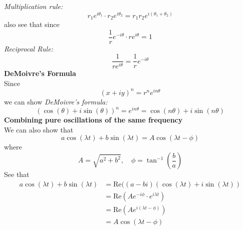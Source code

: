 \documentclass{report}
\begin{document}
\textit{Multiplication rule:}
\begin{equation*}
r_1e^{i\theta_1}\cdot r_2e^{i\theta_2}=r_1r_2e^{i(\theta_1+\theta_2)}
\end{equation*}
also see that since
\begin{equation*}
\frac{1}{r}e^{-i\theta}\cdot re^{i\theta}=1
\end{equation*}
\textit{Reciprocal Rule:} 
\begin{equation*}
\frac{1}{re^{i\theta}}=\frac{1}{r}e^{-i\theta}
\end{equation*}
\textbf{DeMoivre's Formula}\\
Since 
\begin{equation*}
(x+iy)^n=r^ne^{in\theta}
\end{equation*}
we can show \textit{DeMoivre's formula:}
\begin{equation*}
(\cos(\theta)+i\sin(\theta))^n=e^{in\theta}=\cos(n\theta)+i\sin(n\theta)
\end{equation*}
\textbf{Combining pure oscillations of the same frequency}\\
We can also show that
\begin{equation*}
a\cos(\lambda t)+b\sin(\lambda t)=A\cos(\lambda t-\phi)
\end{equation*}
where
\begin{equation*}
A=\sqrt{a^2+b^2},\quad\phi=\tan^{-1}\left(\frac{b}{a}\right)
\end{equation*}
See that
\begin{align*}
a\cos(\lambda t)+b\sin(\lambda t)&=\text{Re}((a-bi)(\cos(\lambda t)+i\sin(\lambda t))\\
&=\text{Re}(Ae^{-i\phi}\cdot e^{i\lambda t})\\
&=\text{Re}(Ae^{i(\lambda t-\phi)})\\
&=A\cos(\lambda t-\phi)
\end{align*}
\newpage
\end{document}
